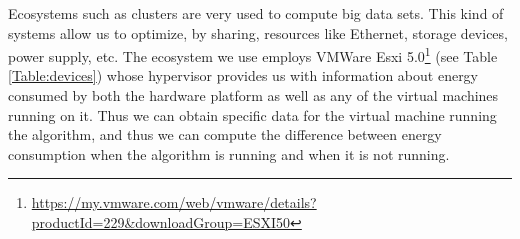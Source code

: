 Ecosystems such as clusters are very used to compute big data sets. This kind of systems allow us to optimize, by sharing, resources like Ethernet, storage devices, power supply, etc. %
The ecosystem we use employs VMWare Esxi 5.0\footnote{\url{https://my.vmware.com/web/vmware/details?productId=229&downloadGroup=ESXI50}} (see Table \ref{Table:devices}) whose hypervisor provides us with information about energy consumed by both the hardware platform as well as any of the virtual machines running on it.  Thus we can obtain specific data for the virtual machine running the algorithm, and thus we can compute the difference between energy consumption when the algorithm is running and when it is not running.  









